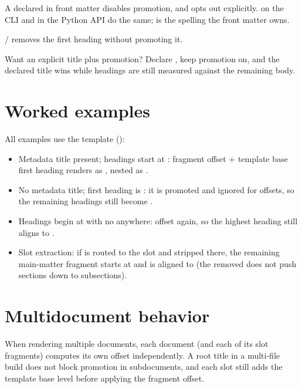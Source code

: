 \documentclass[a4paper,twoside]{article}
\begin{document}
A declared  in front matter disables promotion, and  opts
out explicitly.  on the CLI and  in the
Python API do the same;  is the spelling the front matter owns.

 /  removes the first heading without promoting it.

Want an explicit title plus promotion? Declare , keep promotion on, and the declared title wins while headings are still measured against the remaining body.
\section{Worked examples}
All examples use the  template ():
\begin{itemize}
\item Metadata title present; headings start at \tscodeinline{\#\#}: fragment offset  + template base  first heading renders as , nested \tscodeinline{\#\#\#} as .
\item No metadata title; first heading is : it is promoted and ignored for offsets, so the remaining \tscodeinline{\#\#} headings still become .
\item Headings begin at \tscodeinline{\#\#} with no \tscodeinline{\#} anywhere: offset  again, so the highest heading still aligns to .
\item Slot extraction: if  is routed to the  slot and stripped there, the remaining main-matter fragment starts at \tscodeinline{\#\#} and is aligned to  (the removed \tscodeinline{\#} does not push sections down to subsections).
\end{itemize}
\section{Multidocument behavior}
When rendering multiple documents, each document (and each of its slot fragments) computes its own offset independently. A root title in a multi-file build does not block promotion in subdocuments, and each slot still adds the template base level before applying the fragment offset.
\end{document}
